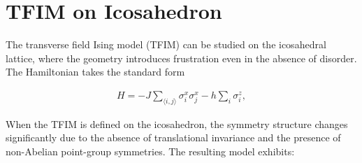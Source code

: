 \documentclass{article}
\begin{document}
\section{TFIM on Icosahedron}

The transverse field Ising model (TFIM) can be studied on the icosahedral lattice, where the geometry introduces frustration even in the absence of disorder. The Hamiltonian takes the standard form

\begin{align}
H = -J \sum_{\langle i, j \rangle} \sigma_i^x \sigma_j^x - h \sum_i \sigma_i^z,
\end{align}

When the TFIM is defined on the icosahedron, the symmetry structure changes significantly due to the absence of translational invariance and the presence of non-Abelian point-group symmetries. The resulting model exhibits:
\end{document}
